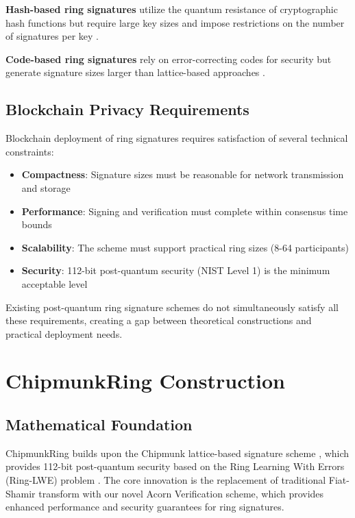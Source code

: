 \documentclass[11pt,a4paper]{article}
\begin{document}
\textbf{Hash-based ring signatures} utilize the quantum resistance of cryptographic hash functions but require large key sizes and impose restrictions on the number of signatures per key \cite{hash-rings}.

\textbf{Code-based ring signatures} rely on error-correcting codes for security but generate signature sizes larger than lattice-based approaches \cite{code-rings}.

\subsection{Blockchain Privacy Requirements}

Blockchain deployment of ring signatures requires satisfaction of several technical constraints:
\begin{itemize}
\item \textbf{Compactness}: Signature sizes must be reasonable for network transmission and storage
\item \textbf{Performance}: Signing and verification must complete within consensus time bounds
\item \textbf{Scalability}: The scheme must support practical ring sizes (8-64 participants)
\item \textbf{Security}: 112-bit post-quantum security (NIST Level 1) is the minimum acceptable level
\end{itemize}

Existing post-quantum ring signature schemes do not simultaneously satisfy all these requirements, creating a gap between theoretical constructions and practical deployment needs.

\section{ChipmunkRing Construction}

\subsection{Mathematical Foundation}

ChipmunkRing builds upon the Chipmunk lattice-based signature scheme \cite{chipmunk2024}, which provides 112-bit post-quantum security based on the Ring Learning With Errors (Ring-LWE) problem \cite{lyubashevsky2010, regev2009}. The core innovation is the replacement of traditional Fiat-Shamir transform \cite{fiat1986} with our novel Acorn Verification scheme, which provides enhanced performance and security guarantees for ring signatures.
\end{document}
